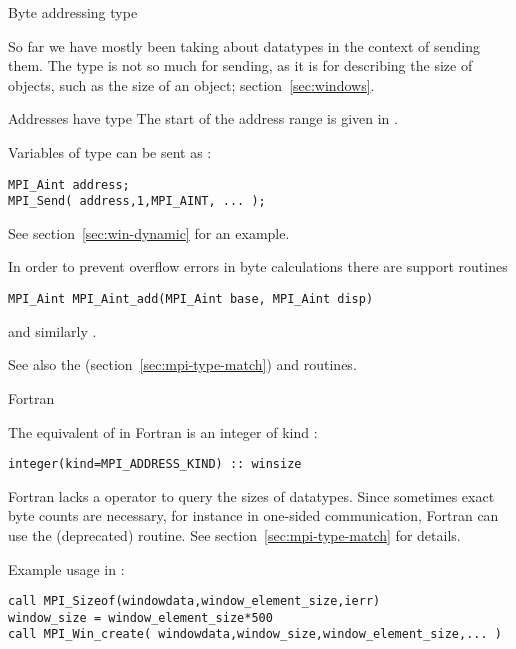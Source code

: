 
 {Byte addressing type}
\label{sec:mpi-byte-type}

So far we have mostly been taking about datatypes in the context of
sending them. The  type is not so much for
sending, as it is for describing the size of objects, such as the size
of an  object; section~\ref{sec:windows}.

Addresses have type  The start of the address range is
given in .

Variables of type  can be sent as :
\begin{lstlisting}
MPI_Aint address;
MPI_Send( address,1,MPI_AINT, ... );
\end{lstlisting}
See section~\ref{sec:win-dynamic} for an example.

In order to prevent overflow errors in byte calculations
there are support routines 
\begin{lstlisting}
MPI_Aint MPI_Aint_add(MPI_Aint base, MPI_Aint disp)
\end{lstlisting}
and similarly .

See also the 
(section~\ref{sec:mpi-type-match})
and
 routines.

 {Fortran}

The equivalent of
 in Fortran
is an integer of kind :
\lstset{style=reviewcode,language=Fortran} %
\begin{lstlisting}
integer(kind=MPI_ADDRESS_KIND) :: winsize
\end{lstlisting}
\lstset{style=reviewcode,language=C} %

Fortran lacks a  operator to query the sizes of datatypes.
Since sometimes exact byte counts are necessary,
for instance in one-sided communication,
Fortran can use the (deprecated)  routine.
See section~\ref{sec:mpi-type-match} for details.

Example usage in :
\lstset{language=Fortran} %
\begin{lstlisting}
call MPI_Sizeof(windowdata,window_element_size,ierr)
window_size = window_element_size*500
call MPI_Win_create( windowdata,window_size,window_element_size,... )
\end{lstlisting}
\lstset{language=C} %


